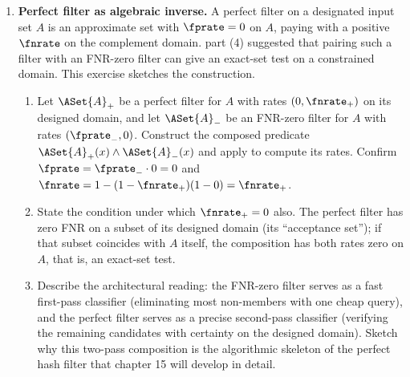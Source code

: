 \begin{enumerate}
\item \exstarstarstar
\label{ex:ch6-10}
\textbf{Perfect filter as algebraic inverse.}
A perfect filter on a designated input set $A$ is an approximate set
with $\fprate = 0$ on $A$, paying with a positive $\fnrate$ on the
complement domain.  part (4) suggested
that pairing such a filter with an FNR-zero filter can give an
exact-set test on a constrained domain. This exercise sketches the
construction.
\begin{enumerate}
  \item[(a)] Let $\ASet{A}_+$ be a perfect filter for $A$ with rates
    $(0, \fnrate_+)$ on its designed domain, and let $\ASet{A}_-$ be
    an FNR-zero filter for $A$ with rates $(\fprate_-, 0)$. Construct
    the composed predicate $\ASet{A}_+(x) \land \ASet{A}_-(x)$ and
    apply  to compute its rates.
    Confirm $\fprate = \fprate_- \cdot 0 = 0$ and
    $\fnrate = 1 - (1 - \fnrate_+)(1 - 0) = \fnrate_+$.
  \item[(b)] State the condition under which $\fnrate_+ = 0$ also.
    The perfect filter has zero FNR on a subset of its designed
    domain (its ``acceptance set''); if that subset coincides with
    $A$ itself, the composition has both rates zero on $A$, that is,
    an exact-set test.
  \item[(c)] Describe the architectural reading: the FNR-zero filter
    serves as a fast first-pass classifier (eliminating most
    non-members with one cheap query), and the perfect filter
    serves as a precise second-pass classifier (verifying the
    remaining candidates with certainty on the designed domain).
    Sketch why this two-pass composition is the algorithmic skeleton
    of the perfect hash filter that chapter 15 will develop in
    detail.
\end{enumerate}


\end{enumerate}
